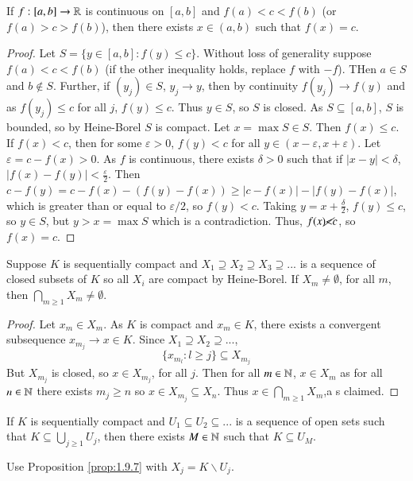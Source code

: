 \begin{theorem}
    If $f:[a,b]\rightarrow \mathbb R$ is continuous on $[a,b]$ and $f(a) < c < f(b)$ (or $f(a) > c > f(b)$), then there exists $x \in (a,b)$ such that $f(x) = c$.
\end{theorem}
\begin{proof}
    Let $S = \{y \in [a,b]: f(y) \leq c\}$. Without loss of generality suppose $f(a) < c < f(b)$ (if the other inequality holds, replace $f$ with $-f$). THen $a \in S$ and $b \notin S$. Further, if $(y_j) \in S$, $y_j\rightarrow y$, then by continuity $f(y_j)\rightarrow f(y)$ and as $f(y_j) \leq c$ for all $j$, $f(y) \leq c$. Thus $y \in S$, so $S$ is closed. As $S \subseteq [a,b]$, $S$ is bounded, so by Heine-Borel $S$ is compact. Let $x = \max S \in S$. Then $f(x) \leq c$. If $f(x) < c$, then for some $\varepsilon > 0$, $f(y) < c$ for all $y \in (x-\varepsilon,x+\varepsilon)$. Let $\varepsilon = c-f(x) > 0$. As $f$ is continuous, there exists $\delta > 0$ such that if $|x-y| < \delta$, $|f(x) - f(y)| < \frac{\varepsilon}{2}$. Then $c-f(y) = c-f(x) - (f(y) - f(x)) \geq |c-f(x)| - |f(y) - f(x)|$, which is greater than or equal to $\varepsilon/2$, so $f(y) < c$. Taking $y = x+\frac{\delta}{2}$, $f(y) \leq c$, so $y \in S$, but $y > x = \max S$ which is a contradiction. Thus, $f(x) \cancel{<} c$, so $f(x) = c$.
\end{proof}

\begin{proposition}\label{prop:1.9.7}
    Suppose $K$ is sequentially compact and $X_1 \supseteq X_2 \supseteq X_3 \supseteq ...$ is a sequence of closed subsets of $K$ so all $X_i$ are compact by Heine-Borel. If $X_m \neq \emptyset$, for all $m$, then $\bigcap_{m\geq 1}X_m\neq \emptyset$.
\end{proposition}
\begin{proof}
    Let $x_m \in X_m$. As $K$ is compact and $x_m \in K$, there exists a convergent subsequence $x_{m_j}\rightarrow x \in K$. Since $X_1 \supseteq X_2 \supseteq ...$, $$\{x_{m_l}: l\geq j\}\subseteq X_{m_j}$$ But $X_{m_j}$ is closed, so $x \in X_{m_j}$, for all $j$. Then for all $m \in \mathbb N$, $x \in X_m$ as for all $n \in \mathbb N$ there exists $m_j \geq n$ so $x \in X_{m_j} \subseteq X_n$. Thus $x \in \bigcap_{m\geq 1}X_m$,a s claimed.
\end{proof}

\begin{corollary}\label{cor:1.9.8}
    If $K$ is sequentially compact and $U_1 \subseteq U_2 \subseteq ...$ is a sequence of open sets such that $K \subseteq \bigcup_{j\geq 1}U_j$, then there exists $M \in \mathbb N$ such that $K \subseteq U_M$.
\end{corollary}
Use Proposition \ref{prop:1.9.7} with $X_j = K \backslash U_j$.

